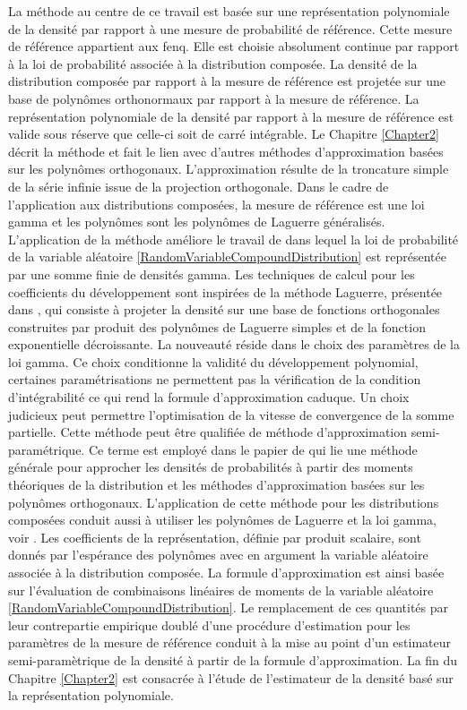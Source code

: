 La méthode au centre de ce travail est basée sur une représentation polynomiale de la densité par rapport à une mesure de probabilité de référence. Cette mesure de référence appartient aux \gls{fenq}. Elle est choisie absolument continue par rapport à la loi de probabilité associée à la distribution composée. La densité de la distribution composée par rapport à la mesure de référence est projetée sur une base de polynômes orthonormaux par rapport à la mesure de référence. La représentation polynomiale de la densité par rapport à la mesure de référence est valide sous réserve que celle-ci soit de carré intégrable. Le Chapitre \ref{Chapter2} décrit la méthode et fait le lien avec d\rq{}autres méthodes d\rq{}approximation basées sur les polynômes orthogonaux. L\rq{}approximation résulte de la troncature simple de la série infinie issue de la projection orthogonale. Dans le cadre de l\rq{}application aux distributions composées, la mesure de référence est une loi gamma et les polynômes sont les polynômes de Laguerre généralisés.  L\rq{}application de la méthode améliore le travail de \citet{Bo66} dans lequel la loi de probabilité de la variable aléatoire \eqref{RandomVariableCompoundDistribution} est représentée par une somme finie de densités gamma. Les techniques de calcul pour les coefficients du développement sont inspirées de la méthode Laguerre, présentée dans \citet{AbChWh95}, qui consiste à projeter la densité sur une base de fonctions orthogonales construites par produit des polynômes de Laguerre simples et de la fonction exponentielle décroissante. La nouveauté réside dans le choix des paramètres de la loi gamma. Ce choix conditionne la validité du développement polynomial, certaines paramétrisations ne permettent pas la vérification de la condition d'intégrabilité ce qui rend la formule d'approximation caduque. Un choix judicieux peut permettre l'optimisation de la vitesse de convergence de la somme partielle. Cette méthode peut être qualifiée de méthode d'approximation semi-paramétrique. Ce terme est employé dans le papier de \citet{Pr05} qui lie une méthode générale pour approcher les densités de probabilités à partir des moments théoriques de la distribution et les méthodes d\rq{}approximation basées sur les polynômes orthogonaux. L\rq{}application de cette méthode pour les distributions composées conduit aussi à utiliser les polynômes de Laguerre et la loi gamma, voir \citet{JiPrRe14}. Les coefficients de la représentation, définie par produit scalaire, sont donnés par l\rq{}espérance des polynômes avec en argument la variable aléatoire associée à la distribution composée. La formule d'approximation est ainsi basée sur l'évaluation de combinaisons linéaires de moments de la variable aléatoire \eqref{RandomVariableCompoundDistribution}. Le remplacement de ces quantités par leur contrepartie empirique doublé d'une procédure d'estimation pour les paramètres de la mesure de référence conduit à la mise au point d'un estimateur semi-paramètrique de la densité à partir de la formule d'approximation. La fin du Chapitre \ref{Chapter2} est consacrée à l\rq{}étude de l\rq{}estimateur de la densité basé sur la représentation polynomiale.\\  

